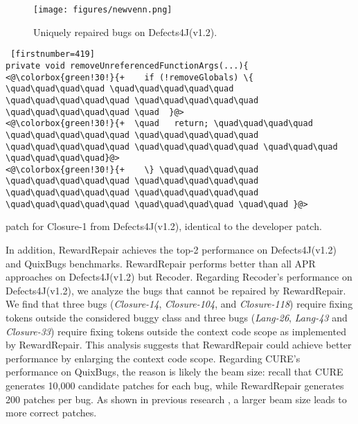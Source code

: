 \begin{figure}
         \texttt{[image: figures/newvenn.png]}
         \caption{Uniquely repaired bugs on Defects4J(v1.2).}
         \label{fig:venn-compare}
\end{figure}

\begin{listing}[t!]
\noindent\begin{minipage}[b]{0.49\textwidth}
    \begin{lstlisting} [firstnumber=419] 
private void removeUnreferencedFunctionArgs(...){          
<@\colorbox{green!30!}{+    if (!removeGlobals) \{ \quad\quad\quad\quad \quad\quad\quad\quad\quad \quad\quad\quad\quad\quad \quad\quad\quad\quad\quad \quad\quad\quad\quad\quad \quad  }@>
<@\colorbox{green!30!}{+  \quad   return; \quad\quad\quad\quad \quad\quad\quad\quad\quad \quad\quad\quad\quad\quad \quad\quad\quad\quad\quad \quad\quad\quad\quad\quad \quad\quad\quad \quad\quad\quad\quad}@>
<@\colorbox{green!30!}{+    \} \quad\quad\quad\quad \quad\quad\quad\quad\quad \quad\quad\quad\quad\quad \quad\quad\quad\quad\quad \quad\quad\quad\quad\quad \quad\quad\quad\quad\quad \quad\quad\quad\quad \quad\quad }@>
    \end{lstlisting}

\end{minipage}%
\caption{\approach patch for Closure-1 from Defects4J(v1.2), identical to the developer patch.}
\label{lst:Closure1}
\end{listing}

In addition, RewardRepair achieves the top-2 performance on Defects4J(v1.2) and QuixBugs benchmarks.
RewardRepair performs better than all APR approaches on Defects4J(v1.2) but Recoder. 
Regarding Recoder's performance on Defects4J(v1.2), we analyze the bugs that cannot be repaired by RewardRepair. 
We find that three bugs (\textit{Closure-14}, \textit{Closure-104}, and \textit{Closure-118}) require fixing tokens outside the considered buggy class  and three bugs (\textit{Lang-26}, \textit{Lang-43} and \textit{Closure-33}) require fixing tokens outside the context code scope as implemented by RewardRepair. 
This analysis suggests that RewardRepair could achieve  better performance by enlarging the context code scope.
Regarding CURE's performance on QuixBugs, the reason is likely the beam size: recall that CURE generates 10,000 candidate patches for each bug, while RewardRepair generates 200 patches per bug. 
As shown in previous research \cite{Tufano-ICSE19}, a larger beam size leads to more correct patches. 

